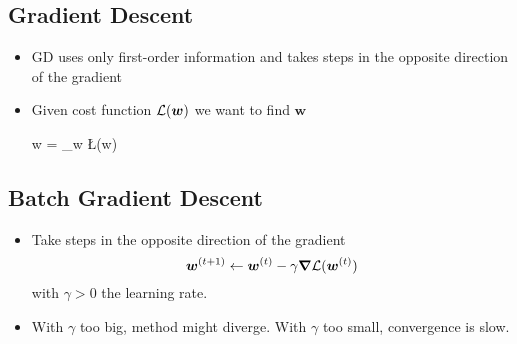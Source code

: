 
\subsection{Gradient Descent}
\begin{itemize}
	\item GD uses only first-order information and takes steps in the opposite direction of the gradient
	\item Given cost function $\mathcal{L}(\bm w)$ we want to find $\bm w$
	\begin{myalign*}
	    \bm w = \arg\min_{\bm w} \L(\bm w)
	\end{myalign*}
\end{itemize}


\subsection{Batch Gradient Descent}
\begin{itemize}
    \item Take steps in the opposite direction of the gradient
    $$ \bm w^{(t + 1)} \leftarrow \bm w^{(t)} - \gamma \bm \nabla \mathcal{L}(\bm w^{(t)})$$
    with $\gamma > 0$ the learning rate. 
    \item With $\gamma$ too big, method might diverge. With $\gamma$ too small, convergence is slow.
\end{itemize}


